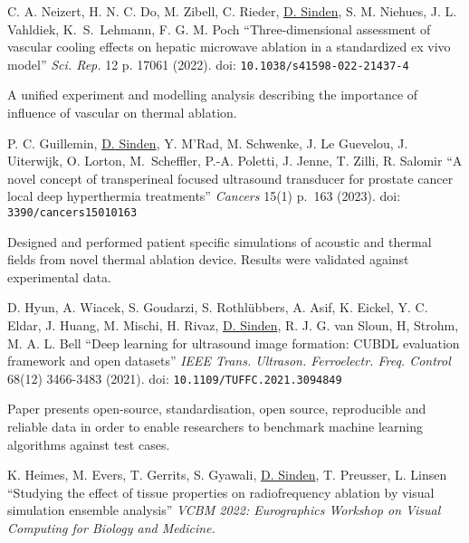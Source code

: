 \documentclass[checked=true, walterbenjamin=false]{dfg-cv-en}
\begin{document}
\begin{compactEnumerate}
\item C. A. Neizert, H. N. C. Do, M. Zibell, C. Rieder, \uline{D. Sinden}, S. M. Niehues, J. L. Vahldiek, K.~S.~Lehmann, F. G. M. Poch \enquote{Three-dimensional assessment of vascular cooling effects on hepatic microwave ablation in a standardized ex vivo model} \emph{Sci. Rep.} 12 p. 17061 (2022). \newline
doi: \texttt{10.1038/s41598-022-21437-4}
\begin{compactItemize}
\item A unified experiment and modelling analysis describing the importance of influence of vascular on thermal ablation. 
\end{compactItemize}
\item  P. C. Guillemin, \uline{D. Sinden}, Y. M’Rad, M. Schwenke, J. Le Guevelou, J. Uiterwijk, O. Lorton, M.~Scheffler, P.-A. Poletti, J. Jenne, T. Zilli, R. Salomir \enquote{A novel concept of transperineal focused ultrasound transducer for prostate cancer local deep hyperthermia treatments} \emph{Cancers} 15(1) p.~163 (2023). doi: \texttt{3390/cancers15010163}
\begin{compactItemize}
\item Designed and performed patient specific simulations of acoustic and thermal fields from novel thermal ablation device. Results were validated against experimental data. 
\end{compactItemize}
\item  D. Hyun, A. Wiacek, S. Goudarzi, S. Rothlübbers, A. Asif, K. Eickel, Y. C. Eldar, J. Huang, M. Mischi, H. Rivaz, \uline{D. Sinden}, R. J. G. van Sloun, H, Strohm, M. A. L. Bell \enquote{Deep learning for ultrasound image formation: CUBDL evaluation framework and open datasets} \emph{IEEE Trans. Ultrason. Ferroelectr. Freq. Control} 68(12) 3466-3483 (2021). 
doi: \texttt{10.1109/TUFFC.2021.3094849}
\begin{compactItemize}
\item Paper presents open-source, standardisation, open source, reproducible and reliable data in order to enable researchers to benchmark machine learning algorithms against test cases.\end{compactItemize}
\item  K. Heimes, M. Evers, T. Gerrits, S. Gyawali, \uline{D. Sinden}, T. Preusser, L. Linsen \enquote{Studying the effect of tissue properties on radiofrequency ablation by visual simulation ensemble analysis} \emph{VCBM 2022: Eurographics Workshop on Visual Computing for Biology and Medicine.}

\end{compactEnumerate}
\end{document}
